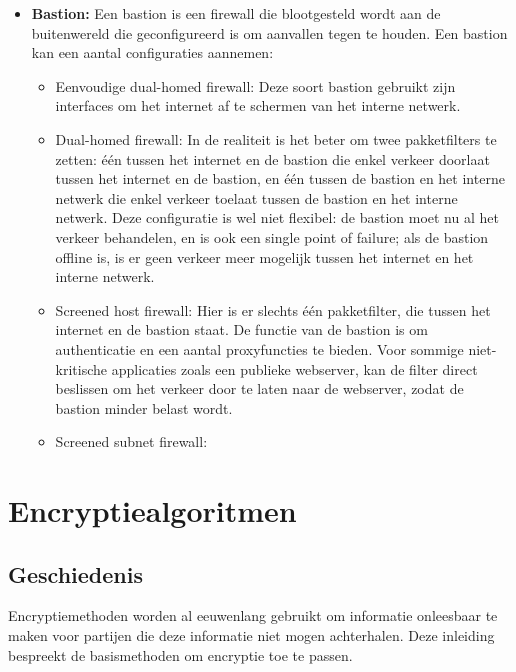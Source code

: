 \documentclass{report}
\begin{document}
\begin{itemize}
		\item[\info] \textbf{Bastion:} Een bastion is een firewall die blootgesteld wordt aan de buitenwereld die geconfigureerd is om aanvallen tegen te houden. Een bastion kan een aantal configuraties aannemen:
		\begin{itemize}
			\item Eenvoudige dual-homed firewall: Deze soort bastion gebruikt zijn interfaces om het internet af te schermen van het interne netwerk.
			\item Dual-homed firewall: In de realiteit is het beter om twee pakketfilters te zetten: één tussen het internet en de bastion die enkel verkeer doorlaat tussen het internet en de bastion, en één tussen de bastion en het interne netwerk die enkel verkeer toelaat tussen de bastion en het interne netwerk.
			Deze configuratie is wel niet flexibel: de bastion moet nu al het verkeer behandelen, en is ook een single point of failure; als de bastion offline is, is er geen verkeer meer mogelijk tussen het internet en het interne netwerk.
			\item Screened host firewall: Hier is er slechts één pakketfilter, die tussen het internet en de bastion staat. De functie van de bastion is om authenticatie en een aantal proxyfuncties te bieden. Voor sommige niet-kritische applicaties zoals een publieke webserver, kan de filter direct beslissen om het verkeer door te laten naar de webserver, zodat de bastion minder belast wordt.
			\item Screened subnet firewall: 
		\end{itemize}
	\end{itemize}

	\chapter{Encryptiealgoritmen}
	\section{Geschiedenis}
	Encryptiemethoden worden al eeuwenlang gebruikt om informatie onleesbaar te maken voor partijen die deze informatie niet mogen achterhalen. Deze inleiding bespreekt de basismethoden om encryptie toe te passen.
	
\end{document}
